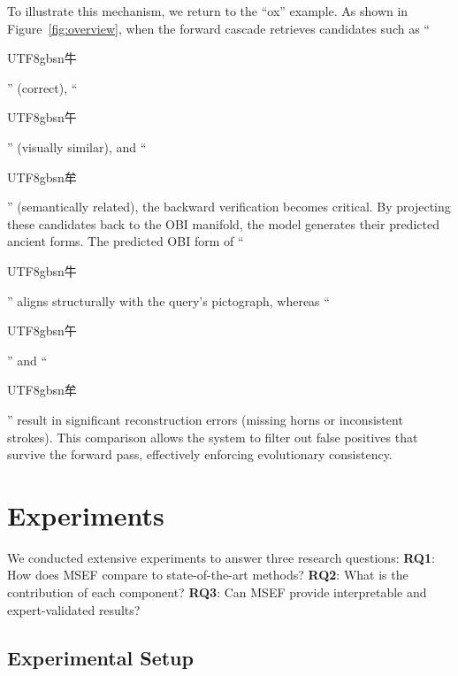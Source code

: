 \documentclass{article}
\newcommand{\cg}[1]{\begin{CJK*}{UTF8}{gbsn}#1\end{CJK*}}
\begin{document}

To illustrate this mechanism, we return to the ``ox'' example. As shown in Figure~\ref{fig:overview}, when the forward cascade retrieves candidates such as ``\cg{牛}'' (correct), ``\cg{午}'' (visually similar), and ``\cg{牟}'' (semantically related), the backward verification becomes critical. By projecting these candidates back to the OBI manifold, the model generates their predicted ancient forms. The predicted OBI form of ``\cg{牛}'' aligns structurally with the query's pictograph, whereas ``\cg{午}'' and ``\cg{牟}'' result in significant reconstruction errors (missing horns or inconsistent strokes). This comparison allows the system to filter out false positives that survive the forward pass, effectively enforcing evolutionary consistency.




\section{Experiments}
We conducted extensive experiments to answer three research questions:
\textbf{RQ1}: How does MSEF compare to state-of-the-art methods?
\textbf{RQ2}: What is the contribution of each component?
\textbf{RQ3}: Can MSEF provide interpretable and expert-validated results?

\subsection{Experimental Setup}
\end{document}
